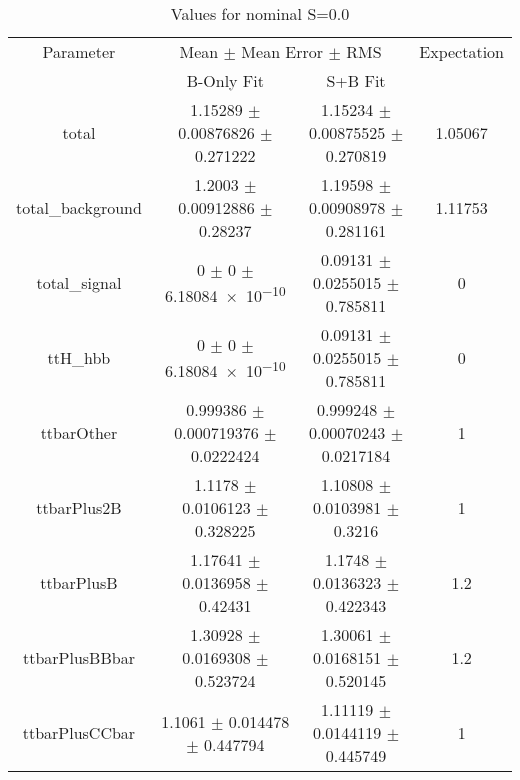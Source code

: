 \begin{table}
\centering
\caption{Values for nominal S=0.0}
\begin{tabular}{cccc}
\toprule
Parameter & \multicolumn{2}{c}{Mean $\pm$ Mean Error $\pm$ RMS} & Expectation\\
 & B-Only Fit & S+B Fit & \\
\midrule
total & \num{1.15289} $\pm$ \num{0.00876826} $\pm$ \num{0.271222} & \num{1.15234} $\pm$ \num{0.00875525} $\pm$ \num{0.270819} & \num{1.05067}\\
total\_background & \num{1.2003} $\pm$ \num{0.00912886} $\pm$ \num{0.28237} & \num{1.19598} $\pm$ \num{0.00908978} $\pm$ \num{0.281161} & \num{1.11753}\\
total\_signal & \num{0} $\pm$ \num{0} $\pm$ \num{6.18084e-10} & \num{0.09131} $\pm$ \num{0.0255015} $\pm$ \num{0.785811} & \num{0}\\
ttH\_hbb & \num{0} $\pm$ \num{0} $\pm$ \num{6.18084e-10} & \num{0.09131} $\pm$ \num{0.0255015} $\pm$ \num{0.785811} & \num{0}\\
ttbarOther & \num{0.999386} $\pm$ \num{0.000719376} $\pm$ \num{0.0222424} & \num{0.999248} $\pm$ \num{0.00070243} $\pm$ \num{0.0217184} & \num{1}\\
ttbarPlus2B & \num{1.1178} $\pm$ \num{0.0106123} $\pm$ \num{0.328225} & \num{1.10808} $\pm$ \num{0.0103981} $\pm$ \num{0.3216} & \num{1}\\
ttbarPlusB & \num{1.17641} $\pm$ \num{0.0136958} $\pm$ \num{0.42431} & \num{1.1748} $\pm$ \num{0.0136323} $\pm$ \num{0.422343} & \num{1.2}\\
ttbarPlusBBbar & \num{1.30928} $\pm$ \num{0.0169308} $\pm$ \num{0.523724} & \num{1.30061} $\pm$ \num{0.0168151} $\pm$ \num{0.520145} & \num{1.2}\\
ttbarPlusCCbar & \num{1.1061} $\pm$ \num{0.014478} $\pm$ \num{0.447794} & \num{1.11119} $\pm$ \num{0.0144119} $\pm$ \num{0.445749} & \num{1}\\
\bottomrule
\end{tabular}
\end{table}